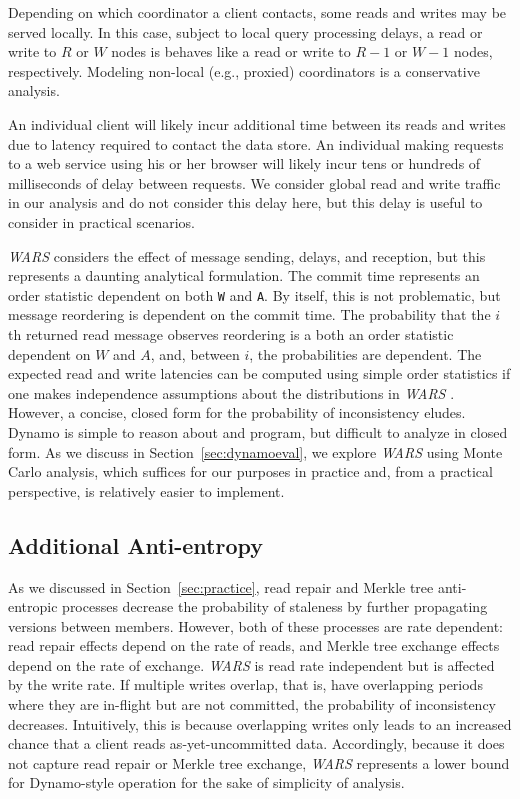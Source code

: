\documentclass{vldb}
\begin{document}
Depending on which coordinator a client contacts, some reads and
writes may be served locally.  In this case, subject to local query
processing delays, a read or write to $R$ or $W$ nodes is behaves like
a read or write to $R-1$ or $W-1$ nodes, respectively.  Modeling
non-local (e.g., proxied) coordinators is a conservative analysis.

An individual client will likely incur additional time between its
reads and writes due to latency required to contact the data store.
An individual making requests to a web service using his or her
browser will likely incur tens or hundreds of milliseconds of delay
between requests.  We consider global read and write traffic in our
analysis and do not consider this delay here, but this delay is useful
to consider in practical scenarios.

\textit{WARS} considers the effect of message sending, delays, and
reception, but this represents a daunting analytical formulation.  The
commit time represents an order statistic dependent on both \texttt{W}
and \texttt{A}.  By itself, this is not problematic, but message
reordering is dependent on the commit time.  The probability that the
$i$th returned read message observes reordering is a both an order
statistic dependent on $W$ and $A$, and, between $i$, the
probabilities are dependent.  The expected read and write latencies
can be computed using simple order statistics if one makes
independence assumptions about the distributions in \textit{WARS} .
However, a concise, closed form for the probability of inconsistency
eludes.  Dynamo is simple to reason about and program, but difficult
to analyze in closed form.  As we discuss in
Section~\ref{sec:dynamoeval}, we explore \textit{WARS} using Monte
Carlo analysis, which suffices for our purposes in practice and, from
a practical perspective, is relatively easier to implement.

\subsection{Additional Anti-entropy}

As we discussed in Section~\ref{sec:practice}, read repair and Merkle
tree anti-entropic processes decrease the probability of staleness by
further propagating versions between members.  However, both of these
processes are rate dependent: read repair effects depend on the rate
of reads, and Merkle tree exchange effects depend on the rate of
exchange.  \textit{WARS} is read rate independent but is affected by
the write rate.  If multiple writes overlap, that is, have overlapping
periods where they are in-flight but are not committed, the
probability of inconsistency decreases.  Intuitively, this is because
overlapping writes only leads to an increased chance that a client
reads as-yet-uncommitted data.  Accordingly, because it does not
capture read repair or Merkle tree exchange, \textit{WARS} represents
a lower bound for Dynamo-style operation for the sake of simplicity of
analysis.
\end{document}

